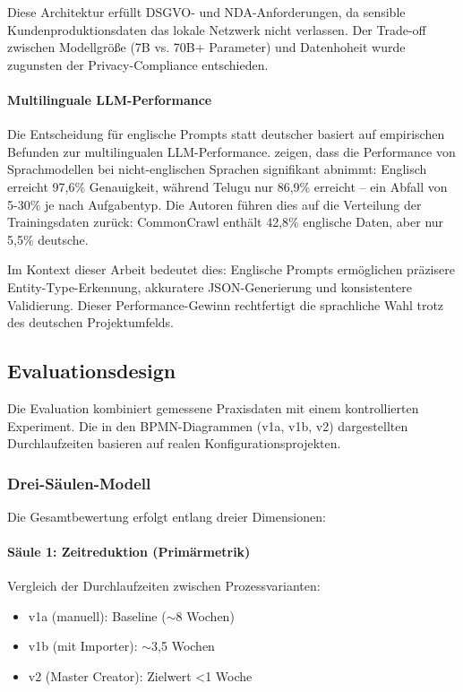 Diese Architektur erfüllt DSGVO- und NDA-Anforderungen, da sensible Kundenproduktionsdaten das lokale Netzwerk nicht verlassen. Der Trade-off zwischen Modellgröße (7B vs. 70B+ Parameter) und Datenhoheit wurde zugunsten der Privacy-Compliance entschieden.

\paragraph{Multilinguale LLM-Performance}

Die Entscheidung für englische Prompts statt deutscher basiert auf empirischen Befunden zur multilingualen LLM-Performance. \cite{gupta:multilingual2025} zeigen, dass die Performance von Sprachmodellen bei nicht-englischen Sprachen signifikant abnimmt: Englisch erreicht 97,6\% Genauigkeit, während Telugu nur 86,9\% erreicht -- ein Abfall von 5-30\% je nach Aufgabentyp. Die Autoren führen dies auf die Verteilung der Trainingsdaten zurück: CommonCrawl enthält 42,8\% englische Daten, aber nur 5,5\% deutsche.

Im Kontext dieser Arbeit bedeutet dies: Englische Prompts ermöglichen präzisere Entity-Type-Erkennung, akkuratere JSON-Generierung und konsistentere Validierung. Dieser Performance-Gewinn rechtfertigt die sprachliche Wahl trotz des deutschen Projektumfelds.


\subsection{Evaluationsdesign}
\label{subsec:Evaluationsdesign}

Die Evaluation kombiniert gemessene Praxisdaten mit einem kontrollierten Experiment. Die in den BPMN-Diagrammen (v1a, v1b, v2) dargestellten Durchlaufzeiten basieren auf realen Konfigurationsprojekten.

\subsubsection{Drei-Säulen-Modell}
\label{subsubsec:DreiSaeulen}

Die Gesamtbewertung erfolgt entlang dreier Dimensionen:

\paragraph{Säule 1: Zeitreduktion (Primärmetrik)}

Vergleich der Durchlaufzeiten zwischen Prozessvarianten:
\begin{itemize}
    \item v1a (manuell): Baseline ($\sim$8 Wochen)
    \item v1b (mit Importer): $\sim$3,5 Wochen
    \item v2 (Master Creator): Zielwert <1 Woche
\end{itemize}

